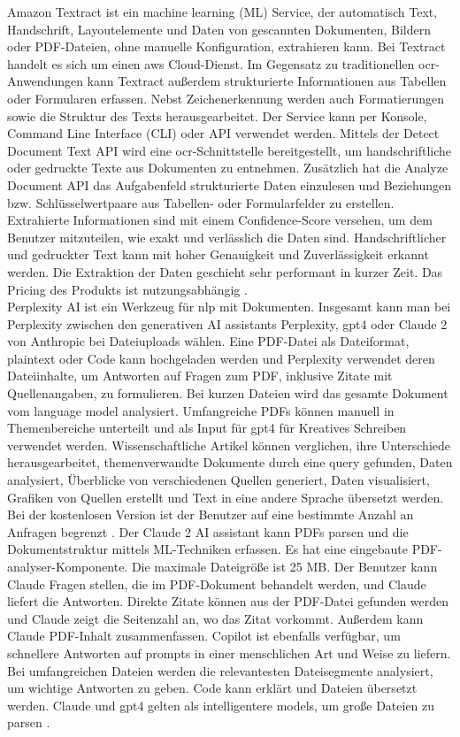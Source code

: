 Amazon Textract ist ein machine learning (ML) Service, der automatisch Text, Handschrift, Layoutelemente und Daten von gescannten Dokumenten, Bildern oder PDF-Dateien, ohne manuelle Konfiguration, extrahieren kann. Bei Textract handelt es sich um einen \gls{aws} Cloud-Dienst. Im Gegensatz zu traditionellen \gls{ocr}-Anwendungen kann Textract außerdem strukturierte Informationen aus Tabellen oder Formularen erfassen. Nebst Zeichenerkennung werden auch Formatierungen sowie die Struktur des Texts herausgearbeitet. Der Service kann per Konsole, Command Line Interface (CLI) oder API verwendet werden. Mittels der Detect Document Text API wird eine \gls{ocr}-Schnittstelle bereitgestellt, um handschriftliche oder gedruckte Texte aus Dokumenten zu entnehmen. Zusätzlich hat die Analyze Document API das Aufgabenfeld strukturierte Daten einzulesen und Beziehungen bzw. Schlüsselwertpaare aus Tabellen- oder Formularfelder zu erstellen. Extrahierte Informationen sind mit einem Confidence-Score versehen, um dem Benutzer mitzuteilen, wie exakt und verlässlich die Daten sind. Handschriftlicher und gedruckter Text kann mit hoher Genauigkeit und Zuverlässigkeit erkannt werden. Die Extraktion der Daten geschieht sehr performant in kurzer Zeit. Das Pricing des Produkts ist nutzungsabhängig \cite{textract}. \\
Perplexity AI ist ein Werkzeug für \gls{nlp} mit Dokumenten. Insgesamt kann man bei Perplexity zwischen den generativen AI assistants Perplexity, \gls{gpt4} oder Claude 2 von Anthropic bei Dateiuploads wählen. Eine PDF-Datei als Dateiformat, plaintext oder Code kann hochgeladen werden und Perplexity verwendet deren Dateiinhalte, um Antworten auf Fragen zum PDF, inklusive Zitate mit Quellenangaben, zu formulieren. Bei kurzen Dateien wird das gesamte Dokument vom language model analysiert. Umfangreiche PDFs können manuell in Themenbereiche unterteilt und als Input für \gls{gpt4} für Kreatives Schreiben verwendet werden. Wissenschaftliche Artikel können verglichen, ihre Unterschiede herausgearbeitet, themenverwandte Dokumente durch eine query gefunden, Daten analysiert, Überblicke von verschiedenen Quellen generiert, Daten visualisiert, Grafiken von Quellen erstellt und Text in eine andere Sprache übersetzt werden. Bei der kostenlosen Version ist der Benutzer auf eine bestimmte Anzahl an Anfragen begrenzt \cite{hackernoon-claude}. Der Claude 2 AI assistant kann PDFs parsen und die Dokumentstruktur mittels ML-Techniken erfassen. Es hat eine eingebaute PDF-analyser-Komponente. Die maximale Dateigröße ist 25 MB. Der Benutzer kann Claude Fragen stellen, die im PDF-Dokument behandelt werden, und Claude liefert die Antworten. Direkte Zitate können aus der PDF-Datei gefunden werden und Claude zeigt die Seitenzahl an, wo das Zitat vorkommt. Außerdem kann Claude PDF-Inhalt zusammenfassen. Copilot ist ebenfalls verfügbar, um schnellere Antworten auf prompts in einer menschlichen Art und Weise zu liefern. Bei umfangreichen Dateien werden die relevantesten Dateisegmente analysiert, um wichtige Antworten zu geben. Code kann erklärt und Dateien übersetzt werden. Claude und \gls{gpt4} gelten als intelligentere models, um große Dateien zu parsen \cite{perplexity}. \\
